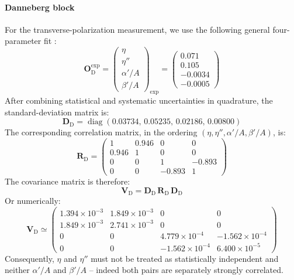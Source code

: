 \paragraph{Danneberg block}
For the transverse-polarization measurement, we use the following general
four-parameter fit \cite{danneberg2005muon}:
\begin{equation}
  \bm{O}^{\mathrm{exp}}_{\mathrm{D}}
  =
  \begin{pmatrix}
    \eta\\
    \eta''\\
    \alpha'/A\\
    \beta'/A
  \end{pmatrix}_{\!\mathrm{exp}}
  =
  \begin{pmatrix}
     0.071\\
     0.105\\
    -0.0034\\
    -0.0005
  \end{pmatrix}
  \label{eq:danneberg-input}
\end{equation}
After combining statistical and systematic uncertainties in quadrature,
the standard-deviation matrix is:
\begin{equation}
  \bm{D}_{\mathrm{D}}
  =
  \operatorname{diag}
  \left(
    0.03734,\,
    0.05235,\,
    0.02186,\,
    0.00800
  \right)
  \label{eq:danneberg-errors}
\end{equation}
The corresponding correlation matrix, in the ordering
$\left(\eta,\eta'',\alpha'/A,\beta'/A\right)$, is:
\begin{equation}
  \bm{R}_{\mathrm{D}}
  =
  \begin{pmatrix}
    1     & 0.946 & 0      & 0\\
    0.946 & 1     & 0      & 0\\
    0     & 0     & 1      & -0.893\\
    0     & 0     & -0.893 & 1
  \end{pmatrix}
  \label{eq:danneberg-correlation}
\end{equation}
The covariance matrix is therefore:
\begin{equation}
  \bm{V}_{\mathrm{D}}
  =
  \bm{D}_{\mathrm{D}}\,
  \bm{R}_{\mathrm{D}}\,
  \bm{D}_{\mathrm{D}}
\end{equation}
Or numerically:
\begin{equation}
  \bm{V}_{\mathrm{D}}
  \simeq
  \begin{pmatrix}
    1.394\times10^{-3} & 1.849\times10^{-3} & 0 & 0\\
    1.849\times10^{-3} & 2.741\times10^{-3} & 0 & 0\\
    0 & 0 & 4.779\times10^{-4} & -1.562\times10^{-4}\\
    0 & 0 & -1.562\times10^{-4} & 6.400\times10^{-5}
  \end{pmatrix}
  \label{eq:danneberg-covariance}
\end{equation}
Consequently, $\eta$ and $\eta''$ must not be treated as statistically
independent and neither $\alpha'/A$ and $\beta'/A$ -- indeed both pairs are separately strongly correlated. 

